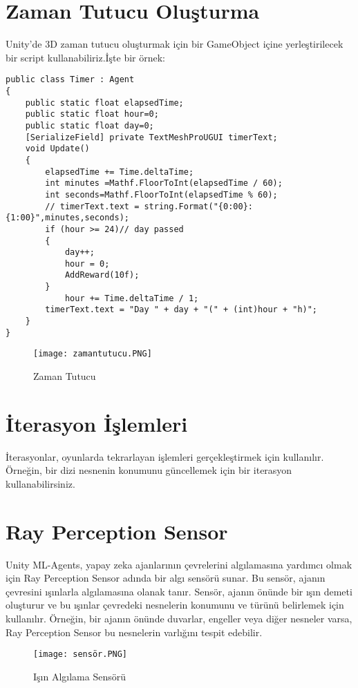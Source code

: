 \documentclass{article}
\begin{document}
\section{Zaman Tutucu Oluşturma}
Unity'de 3D zaman tutucu oluşturmak için bir GameObject içine yerleştirilecek bir script kullanabiliriz.İşte bir örnek:
\begin{verbatim}
public class Timer : Agent
{
    public static float elapsedTime;
    public static float hour=0;
    public static float day=0;
    [SerializeField] private TextMeshProUGUI timerText;
    void Update()
    {
        elapsedTime += Time.deltaTime;
        int minutes =Mathf.FloorToInt(elapsedTime / 60);
        int seconds=Mathf.FloorToInt(elapsedTime % 60);
        // timerText.text = string.Format("{0:00}:{1:00}",minutes,seconds);
        if (hour >= 24)// day passed
        {
            day++;
            hour = 0;
            AddReward(10f);
        }
            hour += Time.deltaTime / 1;
        timerText.text = "Day " + day + "(" + (int)hour + "h)";
    }
}

\end{verbatim}
\begin{figure}[h]
    \centering
    \texttt{[image: zamantutucu.PNG]}
    \caption{Zaman Tutucu}
    \label{fig:resim19}
    \end{figure}
\section{İterasyon İşlemleri}

İterasyonlar, oyunlarda tekrarlayan işlemleri gerçekleştirmek için kullanılır. Örneğin, bir dizi nesnenin konumunu güncellemek için bir iterasyon kullanabilirsiniz.

\section{Ray Perception Sensor}
Unity ML-Agents, yapay zeka ajanlarının çevrelerini algılamasına yardımcı olmak için Ray Perception Sensor adında bir algı sensörü sunar. Bu sensör, ajanın çevresini ışınlarla algılamasına olanak tanır. Sensör, ajanın önünde bir ışın demeti oluşturur ve bu ışınlar çevredeki nesnelerin konumunu ve türünü belirlemek için kullanılır. Örneğin, bir ajanın önünde duvarlar, engeller veya diğer nesneler varsa, Ray Perception Sensor bu nesnelerin varlığını tespit edebilir.
\begin{figure}[h]
    \centering
    \texttt{[image: sensör.PNG]}
    \caption{Işın Algılama Sensörü}
    \label{fig:resim20}
    \end{figure}
\end{document}
